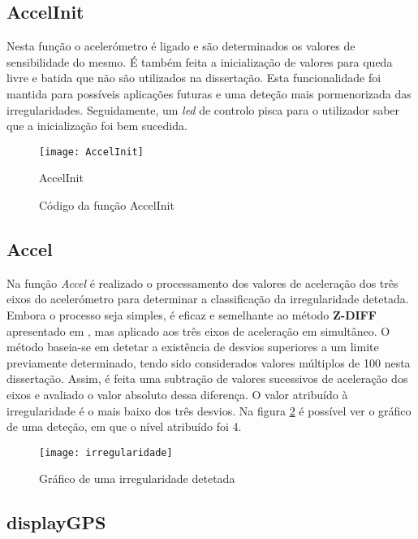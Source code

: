 \vspace{3cm}

\subsection{AccelInit}
\label{sub:accelInit}

Nesta função o acelerómetro é ligado e são determinados os valores de sensibilidade do mesmo.
É também feita a inicialização de valores para queda livre e batida que não são utilizados na dissertação.
Esta funcionalidade foi mantida para possíveis aplicações futuras e uma deteção mais pormenorizada das irregularidades.
Seguidamente, um \emph{led} de controlo pisca para o utilizador saber que a inicialização foi bem sucedida.

\begin{figure}[hbtp]
	\centering
	\texttt{[image: AccelInit]}
	\caption{Código da função AccelInit}
	\label{fig:SDInit}AccelInit
\end{figure}

\subsection{Accel}
\label{sub:accel}

Na função \emph{Accel} é realizado o processamento dos valores de aceleração dos três eixos do acelerómetro para determinar a classificação da irregularidade detetada.
Embora o processo seja simples, é eficaz e semelhante ao método \textbf{Z-DIFF} apresentado em \cite{Mednis2011}, mas aplicado aos três eixos de aceleração em simultâneo.
O método baseia-se em detetar a existência de desvios superiores a um limite previamente determinado, tendo sido considerados valores múltiplos de 100 nesta dissertação.
Assim, é feita uma subtração de valores sucessivos de aceleração dos eixos e avaliado o valor absoluto dessa diferença.
O valor atribuído à irregularidade é o mais baixo dos três desvios.
Na figura \ref{fig:grafico_de_uma_irregularidade_detetada} é possível ver o gráfico de uma deteção, em que o nível atribuído foi 4.

\begin{figure}[hbtp]
	\centering
	\texttt{[image: irregularidade]}
	\caption{Gráfico de uma irregularidade detetada}
	\label{fig:grafico_de_uma_irregularidade_detetada}
\end{figure}

\subsection{displayGPS}
\label{sub:displayGPS}

